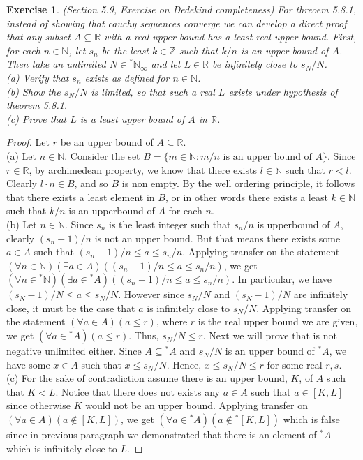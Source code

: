\documentclass[a4paper, 11pt]{book}
\theoremstyle{plain}
\newtheorem{exercise}{Exercise}[chapter]
\theoremstyle{plain}
\newcommand{\N}{\mathbb{N}}
\newcommand{\Z}{\mathbb{Z}}
\newcommand{\R}{\mathbb{R}}
\newcommand{\hyp}{{}^*}
\begin{document}
  \begin{exercise}
    (Section 5.9, Exercise on Dedekind completeness)
    For threoem 5.8.1, instead of showing that cauchy sequences converge we can develop a direct proof that any subset $A \subseteq \R$ with a real upper bound has a least real upper bound. First, for each $n \in \N$, let $s_n$ be the least $k \in \Z$ such that $k/n$ is an upper bound of $A$. Then take an unlimited $N \in \hyp \N_\infty$ and let $L \in \R$ be infinitely close to $s_N/N$. \\
    (a) Verify that $s_n$ exists as defined for $n \in \N$. \\
    (b) Show the $s_N/N$ is limited, so that such a real $L$ exists under hypothesis of theorem 5.8.1. \\
    (c) Prove that $L$ is a least upper bound of $A$ in $\R$.
  \end{exercise}
  \begin{proof} Let $r$ be an upper bound of $A \subseteq \R$. \\
    (a) Let $n \in \N$. Consider the set $B=\{m \in \N: m/n \text{ is an upper bound of } A \}$. Since $r \in \R$, by archimedean property, we know that there exists $l \in \N$ such that $r<l$. Clearly $l\cdot n \in B$, and so $B$ is non empty. By the well ordering principle, it follows that there exists a least element in $B$, or in other words there exists a least $k \in \N$ such that $k/n$ is an upperbound of $A$ for each $n$. \\

    (b) Let $n \in \N$. Since $s_n$ is the least integer such that $s_n/n$ is upperbound of $A$, clearly $(s_n-1)/n$ is not an upper bound. But that means there exists some $a \in A$ such that $(s_n-1)/n \leq a \leq s_n/n$. Applying transfer on the statement $(\forall n \in \N) (\exists a \in A) ((s_n-1)/n \leq a \leq s_n/n)$, we get $(\forall n \in \hyp \N) (\exists a \in \hyp A) ((s_n-1)/n \leq a \leq s_n/n)$. In particular, we have $(s_N-1)/N \leq a \leq s_N/N$. However since $s_N/N$ and $(s_N-1)/N$ are infinitely close, it must be the case that $a$ is infinitely close to $s_N/N$. Applying transfer on the statement $(\forall a \in A) (a \leq r)$, where $r$ is the real upper bound we are given, we get $(\forall a \in \hyp A)(a \leq r)$.  Thus, $s_N/N \leq r$. Next we will prove that is not negative unlimited either. Since $A \subseteq \hyp A$ and $s_N/N$ is an upper bound of $\hyp A$, we have some $x \in A$ such that $x \leq s_N/N$. Hence, $x \leq s_N/N \leq r$ for some real $r,s$. \\

    (c) For the sake of contradiction assume there is an upper bound, $K$, of $A$ such that $K<L$. Notice that there does not exists any $a \in A$ such that $a \in [K, L]$ since otherwise $K$ would not be an upper bound. Applying transfer on $(\forall a \in A) (a \notin [K, L])$, we get $(\forall a \in \hyp A)(a \notin \hyp [K, L])$ which is false since in previous paragraph we demonstrated that there is an element of $\hyp A$ which is infinitely close to $L$.
  \end{proof}
\end{document}
